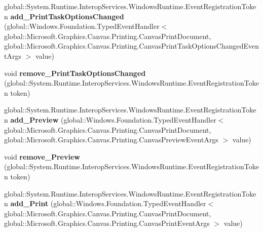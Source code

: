 \begin{DoxyCompactItemize}
global\+::\+System.\+Runtime.\+Interop\+Services.\+Windows\+Runtime.\+Event\+Registration\+Token {\bfseries add\+\_\+\+Print\+Task\+Options\+Changed} (global\+::\+Windows.\+Foundation.\+Typed\+Event\+Handler$<$ global\+::\+Microsoft.\+Graphics.\+Canvas.\+Printing.\+Canvas\+Print\+Document, global\+::\+Microsoft.\+Graphics.\+Canvas.\+Printing.\+Canvas\+Print\+Task\+Options\+Changed\+Event\+Args $>$ value)
\item 
\mbox{\label{interface_microsoft_1_1_graphics_1_1_canvas_1_1_printing_1_1_i_canvas_print_document_a1da96a2ebf4b67369628fa017a384b71}} 
void {\bfseries remove\+\_\+\+Print\+Task\+Options\+Changed} (global\+::\+System.\+Runtime.\+Interop\+Services.\+Windows\+Runtime.\+Event\+Registration\+Token token)
\item 
\mbox{\label{interface_microsoft_1_1_graphics_1_1_canvas_1_1_printing_1_1_i_canvas_print_document_abaff1fcd43de732d25ae88fef48a23a9}} 
global\+::\+System.\+Runtime.\+Interop\+Services.\+Windows\+Runtime.\+Event\+Registration\+Token {\bfseries add\+\_\+\+Preview} (global\+::\+Windows.\+Foundation.\+Typed\+Event\+Handler$<$ global\+::\+Microsoft.\+Graphics.\+Canvas.\+Printing.\+Canvas\+Print\+Document, global\+::\+Microsoft.\+Graphics.\+Canvas.\+Printing.\+Canvas\+Preview\+Event\+Args $>$ value)
\item 
\mbox{\label{interface_microsoft_1_1_graphics_1_1_canvas_1_1_printing_1_1_i_canvas_print_document_a86ed67a2bf892a9f75d0f01ef8fa6436}} 
void {\bfseries remove\+\_\+\+Preview} (global\+::\+System.\+Runtime.\+Interop\+Services.\+Windows\+Runtime.\+Event\+Registration\+Token token)
\item 
\mbox{\label{interface_microsoft_1_1_graphics_1_1_canvas_1_1_printing_1_1_i_canvas_print_document_a4a78f4b715e692c620d4548df21d5ac0}} 
global\+::\+System.\+Runtime.\+Interop\+Services.\+Windows\+Runtime.\+Event\+Registration\+Token {\bfseries add\+\_\+\+Print} (global\+::\+Windows.\+Foundation.\+Typed\+Event\+Handler$<$ global\+::\+Microsoft.\+Graphics.\+Canvas.\+Printing.\+Canvas\+Print\+Document, global\+::\+Microsoft.\+Graphics.\+Canvas.\+Printing.\+Canvas\+Print\+Event\+Args $>$ value)

\end{DoxyCompactItemize}
